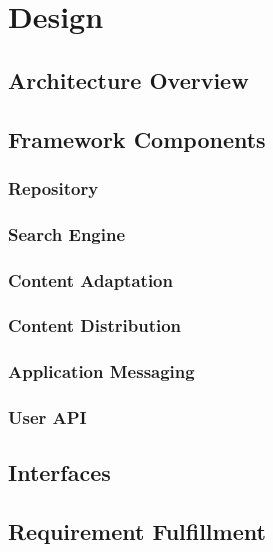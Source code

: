 \chapter{Design\label{cha:chapter4}}

\section{Architecture Overview\label{sec:des_ar_ov}}

\section{Framework Components\label{sec:des_com}}
	
	\subsection{Repository\label{sec:des_repo}}
	
	\subsection{Search Engine\label{sec:des_se_en}}
	
	\subsection{Content Adaptation\label{sec:des_ar_ov}}
		
	\subsection{Content Distribution\label{sec:des_cdn}}	
	
	\subsection{Application Messaging\label{sec:des_me}}
	
	\subsection{User API\label{sec:des_api}}

\section{Interfaces\label{sec:des_inter}}

\section{Requirement Fulfillment\label{sec:des_inter}}